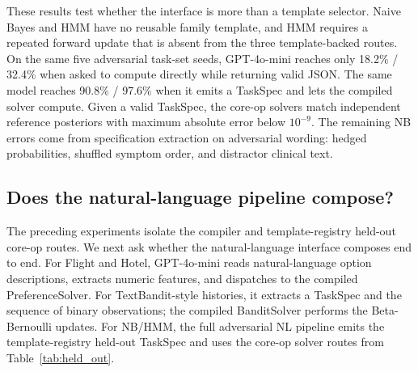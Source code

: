 \documentclass{article}
\newcommand{\taskspec}{TaskSpec}
\begin{document}
These results test whether the interface is more than a template selector.
Naive Bayes and HMM have no reusable family template, and HMM requires a repeated forward update that is absent from the three template-backed routes.
On the same five adversarial task-set seeds, GPT-4o-mini reaches only 18.2\% / 32.4\% when asked to compute directly while returning valid JSON.
The same model reaches 90.8\% / 97.6\% when it emits a \taskspec{} and lets the compiled solver compute.
Given a valid \taskspec{}, the core-op solvers match independent reference posteriors with maximum absolute error below $10^{-9}$.
The remaining NB errors come from specification extraction on adversarial wording: hedged probabilities, shuffled symptom order, and distractor clinical text.

\subsection{Does the natural-language pipeline compose?}
\label{sec:e2e}

The preceding experiments isolate the compiler and template-registry held-out core-op routes.
We next ask whether the natural-language interface composes end to end.
For Flight and Hotel, GPT-4o-mini reads natural-language option descriptions, extracts numeric features, and dispatches to the compiled PreferenceSolver.
For TextBandit-style histories, it extracts a \taskspec{} and the sequence of binary observations; the compiled BanditSolver performs the Beta-Bernoulli updates.
For NB/HMM, the full adversarial NL pipeline emits the template-registry held-out \taskspec{} and uses the core-op solver routes from Table~\ref{tab:held_out}.
\end{document}
